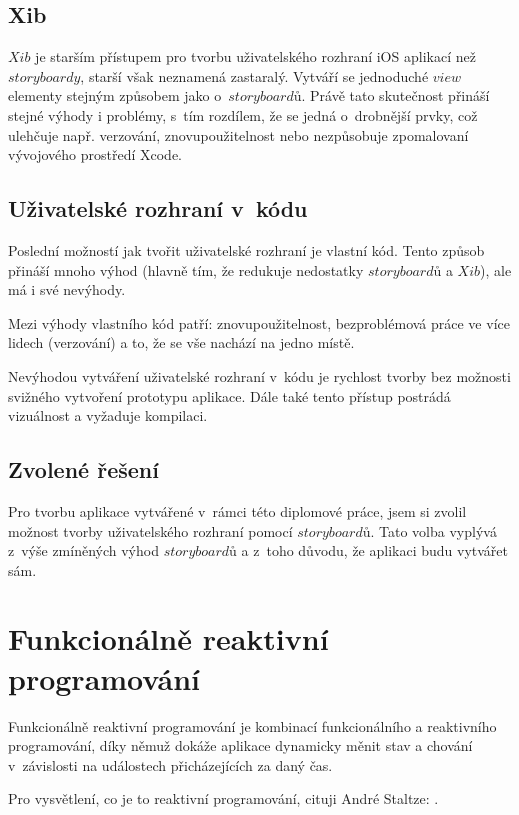 \documentclass[thesis=M,czech]{FITthesis}[2012/06/26]
\begin{document}
\subsection{Xib}
$Xib$ je starším přístupem pro tvorbu uživatelského rozhraní iOS aplikací než $storyboardy$, starší však neznamená zastaralý. Vytváří se jednoduché $view$ elementy stejným způsobem jako o~$storyboardů$. Právě tato skutečnost přináší stejné výhody i problémy, s~tím rozdílem, že se jedná o~drobnější prvky, což ulehčuje např. verzování, znovupoužitelnost nebo nezpůsobuje zpomalovaní vývojového prostředí Xcode. \cite{iOSUI} \cite{dominik}

\subsection{Uživatelské rozhraní v~kódu}
Poslední možností jak tvořit uživatelské rozhraní je vlastní kód. Tento způsob přináší mnoho výhod (hlavně tím, že redukuje nedostatky $storyboardů$ a $Xib$), ale má i své nevýhody.

Mezi výhody vlastního kód patří: znovupoužitelnost, bezproblémová práce ve více lidech (verzování) a to, že se vše nachází na jedno místě. 

Nevýhodou vytváření uživatelské rozhraní v~kódu je rychlost tvorby bez možnosti svižného vytvoření prototypu aplikace. Dále také tento přístup postrádá vizuálnost a vyžaduje kompilaci. \cite{iOSUI} \cite{dominik}

\subsection{Zvolené řešení}
Pro tvorbu aplikace vytvářené v~rámci této diplomové práce, jsem si zvolil možnost tvorby uživatelského rozhraní pomocí $storyboardů$. Tato volba vyplývá z~výše zmíněných výhod $storyboardů$ a z~toho důvodu, že aplikaci budu vytvářet sám.

\section{Funkcionálně reaktivní programování}
Funkcionálně reaktivní programování je kombinací funkcionálního a reaktivního programování, díky němuž dokáže aplikace dynamicky měnit stav a chování v~závislosti na událostech přicházejících za daný čas. \cite{nayebi2016swift}

Pro vysvětlení, co je to reaktivní programování, cituji André Staltze: . \cite{Ztaltz2014}
\end{document}
